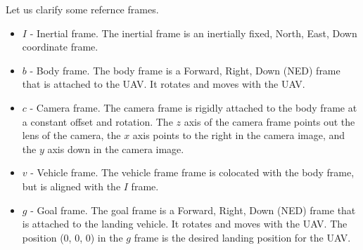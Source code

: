 \documentclass[a4paper]{article}
\begin{document}
Let us clarify some refernce frames.
\begin{itemize}
  \item $I$ - Inertial frame. The inertial frame is an inertially fixed, North,
    East, Down coordinate frame.
  \item $b$ - Body frame. The body frame is a Forward, Right, Down (NED) frame
    that is attached to the UAV. It rotates and moves with the UAV.
  \item $c$ - Camera frame. The camera frame is rigidly attached to the body
    frame at a constant offset and rotation. The $z$ axis of the camera frame
    points out the lens of the camera, the $x$ axis points to the right in the
    camera image, and the $y$ axis down in the camera image.
  \item $v$ - Vehicle frame. The vehicle frame frame is colocated with the body
    frame, but is aligned with the $I$ frame.
  \item $g$ - Goal frame. The goal frame is a Forward, Right, Down (NED) frame
    that is attached to the landing vehicle. It rotates and moves with the UAV.
    The position (0, 0, 0) in the $g$ frame is the desired landing position for
    the UAV.
\end{itemize}
\end{document}
